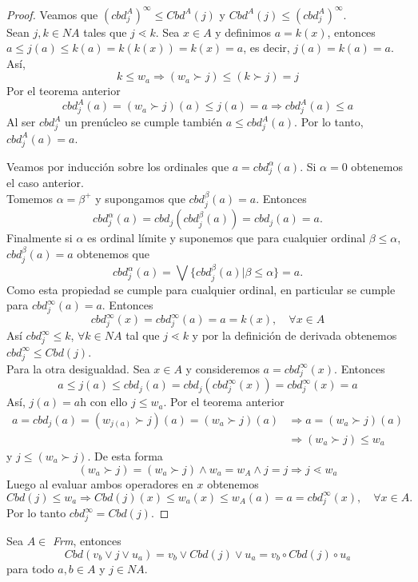 \begin{proof}Veamos que $(cbd_j^A)^\infty\leq Cbd^A(j)$ y $Cbd^A(j)\leq (cbd_j^A)^\infty$.\\
Sean $j,k\in NA$ tales que $j\lessdot k$. Sea $x\in A$ y definimos $a=k(x)$, entonces $a\leq j(a)\leq k(a)=k(k(x))=k(x)=a$, es decir, $j(a)=k(a)=a$. Así, $$k\leq w_a\Rightarrow (w_a\succ j)\leq (k\succ j)=j$$ 
Por el teorema anterior $$cbd_j^A(a)=(w_a\succ j)(a)\leq j(a)=a \Rightarrow cbd_j^A(a)\leq a$$
Al ser $cbd_j^A$ un prenúcleo se cumple también $a\leq cbd_j^A(a)$. Por lo tanto, $cbd_j^A(a)=a$.

\noindent
Veamos por inducción sobre los ordinales que $a=cbd_j^\alpha(a)$. Si $\alpha=0$ obtenemos el caso anterior.\\
Tomemos $\alpha=\beta^{+}$ y supongamos que $cbd_j^\beta(a)=a$.
Entonces
\[
  cbd_j^\alpha (a)=cbd_j(cbd_j^\beta(a))=cbd_j(a)=a
.\]
Finalmente si $\alpha$ es ordinal límite y suponemos que para cualquier ordinal $\beta\leq \alpha$, $cbd_j^\beta(a)=a$ obtenemos que $$cbd_j^\alpha(a)=\bigvee \{cbd_j^\beta(a)|\beta\leq \alpha\}=a.$$
Como esta propiedad se cumple para cualquier ordinal, en particular se cumple para $cbd_j^\infty(a)=a$. Entonces $$cbd_j^\infty(x)=cbd_j^\infty(a)=a=k(x), \quad \forall x\in A$$
Así $cbd_j^\infty\leq k$, $\forall k\in NA$ tal que $j\lessdot k$ y por la definición de derivada obtenemos $cbd_j^\infty\leq Cbd(j)$.\\
Para la otra desigualdad. Sea $x\in A$ y consideremos $a=cbd_j^\infty(x)$. Entonces $$a\leq j(a)\leq cbd_j(a)=cbd_j(cbd_j^\infty(x))=cbd_j^\infty(x)=a$$
Así, $j(a)=a$h con ello $j\leq w_a$. Por el teorema anterior
\begin{equation*}
\begin{split}
a=cbd_j(a)=(w_{j(a)}\succ j)(a)=(w_a\succ j)(a) & \Rightarrow a=(w_a\succ j)(a)\\
& \Rightarrow (w_a\succ j)\leq w_a
\end{split}
\end{equation*}
y $j\leq (w_a\succ j)$. De esta forma 
$$(w_a\succ j)=(w_a\succ j)\wedge w_a=w_A\wedge j=j\Rightarrow j\lessdot w_a$$
Luego al evaluar ambos operadores en $x$ obtenemos $$Cbd(j)\leq w_a\Rightarrow Cbd(j)(x)\leq w_a(x)\leq w_A(a)=a=cbd_j^\infty(x), \quad\forall x\in A.$$ 
Por lo tanto $cbd_j^\infty=Cbd(j)$.

\end{proof}

\begin{lemma}
Sea $A\in$ \textit{Frm}, entonces 
$$Cbd(v_b\vee j\vee u_a)=v_b\vee Cbd(j)\vee u_a=v_b\circ Cbd(j)\circ u_a$$
para todo $a,b\in A$ y $j\in NA.$
\end{lemma}

